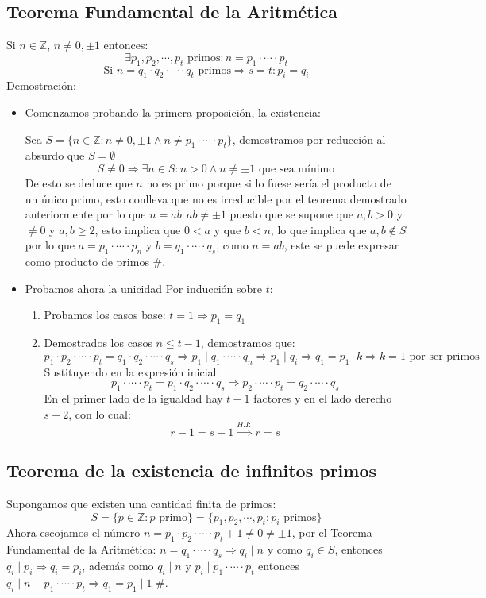 \documentclass[10pt,a4paper,openright]{book}
\theoremstyle{break}
\begin{document}
\subsection{Teorema Fundamental de la Aritmética}
Si $n\in \mathbb Z$, $n\neq 0, \pm 1$ entonces:
$$\exists p_1, p_2, \cdots, p_t \mbox{ primos}: n=p_1\cdot \cdots \cdot p_t$$
$$\mbox{Si }n=q_1\cdot q_2\cdot  \cdots\cdot  q_t \mbox{ primos}\Rightarrow s=t: p_i=q_i $$
\underline{Demostración}:
\begin{itemize}
\item Comenzamos probando la primera proposición, la existencia:\par
Sea $S=\{n\in \mathbb Z : n\neq 0, \pm 1 \wedge n\neq p_1\cdot \cdots \cdot p_t\}$, demostramos por reducción al absurdo que $S=\emptyset$
$$S\neq 0 \Rightarrow \exists n \in S : n>0 \wedge n\neq \pm 1 \mbox{ que sea mínimo}$$
De esto se deduce que $n$ no es primo porque si lo fuese sería el producto de un único primo, esto conlleva que no es irreducible por el teorema demostrado anteriormente por lo que $n=ab : ab\neq \pm 1$ puesto que se supone que $a,b>0$ y $\neq 0$ y $a,b\geq 2$, esto implica que $0<a$ y que $b<n$, lo que implica que $a,b\notin S$ por lo que $a=p_1\cdot \cdots \cdot p_n$ y $b=q_1\cdot \cdots\cdot q_s$, como $n=ab$, este se puede expresar como producto de primos \#.

\item Probamos ahora la unicidad
Por inducción sobre $t$:
\begin{enumerate}
\item Probamos los casos base: $t=1\Rightarrow p_1=q_1$

\item Demostrados los casos $n\leq t-1$, demostramos que:
$$p_1\cdot p_2 \cdot \cdots \cdot p_t=q_1\cdot q_2 \cdot \cdots \cdot q_s \Rightarrow p_1\mid q_1\cdot \cdots \cdot q_n\Rightarrow p_1\mid q_i \Rightarrow q_1=p_1\cdot k \Rightarrow k=1\mbox{ por ser primos}$$
Sustituyendo en la expresión inicial:
$$p_1\cdot \cdots \cdot p_t=p_1\cdot q_2\cdot \cdots \cdot q_s\Rightarrow p_2\cdot \cdots \cdot p_t=q_2\cdot \cdots \cdot q_s$$
En el primer lado de la igualdad hay $t-1$ factores y en el lado derecho $s-2$, con lo cual:
$$r-1=s-1\stackrel{H.I:}{\Rightarrow }r=s$$
\end{enumerate}
\end{itemize}

\subsection{Teorema de la existencia de infinitos primos}
Supongamos que existen una cantidad finita de primos:
$$S=\{p\in \mathbb Z: p \mbox{ primo}\}=\{p_1,p_2,\cdots,p_t: p_i\mbox{ primos}\}$$
Ahora escojamos el número $n=p_1\cdot p_2\cdot \cdots \cdot p_t+1\neq 0\neq \pm 1$, por el Teorema Fundamental de la Aritmética: $n=q_1\cdot \cdots \cdot q_s\Rightarrow q_i\mid n$ y como $q_i\in S$, entonces $q_i\mid p_i\Rightarrow q_i=p_i$, además como $q_i\mid n$ y $p_i\mid p_1\cdot \cdots\cdot p_t$ entonces $q_i\mid n-p_1\cdot \cdots\cdot p_t\Rightarrow q_1=p_1\mid 1$ \#.
\end{document}
